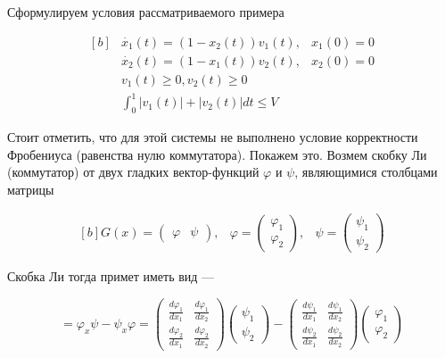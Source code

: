 Сформулируем условия рассматриваемого примера

\begin{equation*}
  \begin{aligned}[b]
    &\dot{x_1}(t) = (1 -x_2(t))v_1(t), & x_1(0)=0\\
    &\dot{x_2}(t) = (1-x_1(t))v_2(t), & x_2(0) = 0\\[8pt]
    &v_1(t) \ge 0, v_2(t) \ge 0 \\
    &\int_{0}^{1} |v_1(t)| + |v_2(t)| dt \le V
  \end{aligned}
\end{equation*}


Стоит отметить, что для этой системы не выполнено условие корректности
Фробениуса (равенства нулю коммутатора). Покажем это. Возмем скобку
Ли (коммутатор) от двух гладких вектор-функций $\varphi$ и $\psi$,
являющимися столбцами матрицы

\begin{equation*}
  \begin{aligned}[b]
    G(x) = 
    \begin{pmatrix}
      \varphi & \psi
    \end{pmatrix},
    &
    \varphi =
    \begin{pmatrix}
      \varphi_1\\ \varphi_2
    \end{pmatrix},
    &
    \psi =
    \begin{pmatrix}
      \psi_1 \\ \psi_2
    \end{pmatrix}
  \end{aligned}
\end{equation*}


Скобка Ли тогда примет иметь вид ---

\begin{equation*}
  [\varphi,\psi] = \varphi_x \psi - \psi_x \varphi = 
  \begin{pmatrix}
    \frac{d \varphi_1}{d x_1} & \frac{d \varphi_1}{d x_2} \\
    \frac{d \varphi_2}{d x_1} & \frac{d \varphi_2}{d x_2}
  \end{pmatrix}
  \begin{pmatrix}
    \psi_1 \\ \psi_2
  \end{pmatrix}
  -
  \begin{pmatrix}
    \frac{d \psi_1}{d x_1} & \frac{d \psi_1}{d x_2} \\
    \frac{d \psi_2}{d x_1} & \frac{d \psi_2}{d x_2}
  \end{pmatrix}
  \begin{pmatrix}
    \varphi_1 \\ \varphi_2
  \end{pmatrix}
\end{equation*}

